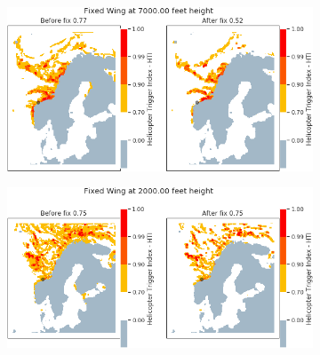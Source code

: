 \begin{figure}[H]
    \begin{subfigure}{0.45\textwidth}
    \centering
    \includegraphics[width=\textwidth]{Figures/09.png}
    \caption{}
    \label{fig:HTI09}
    \end{subfigure}
\hfill
    \begin{subfigure}{0.45\textwidth}
    \centering
    \includegraphics[width=\textwidth]{Figures/11.png}
    \caption{}
    \label{fig:HTI11}
    \end{subfigure}
    

\end{figure}
